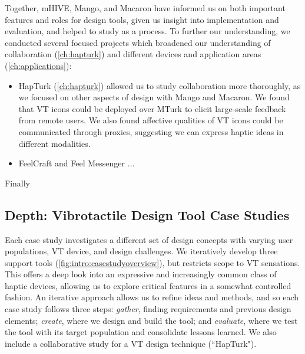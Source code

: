 Together, mHIVE, Mango, and Macaron have informed us on both important features and roles for design tools, given us insight into implementation and evaluation, and helped to study \haxd as a process.
To further our understanding, we conducted several focused projects which broadened our understanding of collaboration (\autoref{ch:hapturk}) and different devices and application areas (\autoref{ch:applications}):

\begin{itemize}
	\item HapTurk (\autoref{ch:hapturk}) allowed us to study collaboration more thoroughly, as we focused on other aspects of design with Mango and Macaron. We found that VT icons could be deployed over MTurk to elicit large-scale feedback from remote users. We also found affective qualities of VT icons could be communicated through proxies, suggesting we can express haptic ideas in different modalities.
	\item FeelCraft and Feel Messenger ...
\end{itemize}

Finally 


\subsection{Depth: Vibrotactile Design Tool Case Studies}

Each case study investigates a different set of design concepts with varying user populations, VT device, and design challenges.
We iteratively develop three \haxd support tools (\autoref{fig:intro:casestudyoverview}), but restricts scope to VT sensations.
This offers a deep look into an expressive and increasingly common class of haptic devices, allowing us to explore critical features in a somewhat controlled fashion.
An iterative approach allows us to refine ideas and methods, and so each case study follows three steps: \emph{gather}, finding requirements and previous design elements; \emph{create}, where we design and build the tool; and \emph{evaluate}, where we test the tool with its target population and consolidate lessons learned.
We also include a collaborative study for a VT design technique (``HapTurk").


